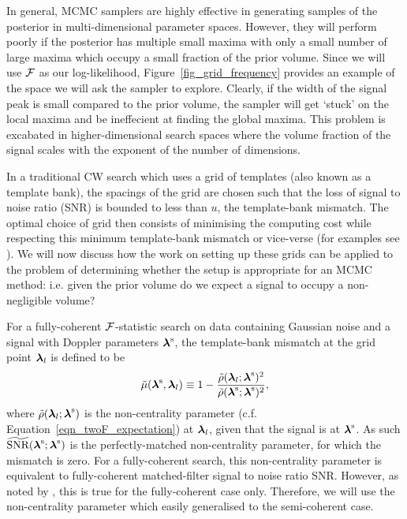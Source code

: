 \documentclass[aps, prd, twocolumn, superscriptaddress, floatfix, showpacs, nofootinbib, longbibliography]{revtex4-1}
\begin{document}
In general, MCMC samplers are highly effective in generating samples of the
posterior in multi-dimensional parameter spaces. However, they will perform
poorly if the posterior has multiple small maxima with only a small number of
large maxima which occupy a small fraction of the prior volume. Since we will
use ${\mathcal{F}}$ as our log-likelihood, Figure~\ref{fig_grid_frequency} provides an
example of the space we will ask the sampler to explore. Clearly, if the width
of the signal peak is small compared to the prior volume, the sampler will get
`stuck' on the local maxima and be ineffecient at finding the global maxima.
This problem is excabated in higher-dimensional search spaces where the volume
fraction of the signal scales with the exponent of the number of dimensions.

In a traditional CW search which uses a grid of templates (also known as a
template bank), the spacings of the grid are chosen such that the loss of
signal to noise ratio (SNR) is bounded to less than $u$, the template-bank
mismatch. The optimal choice of grid then consists of minimising the computing
cost while respecting this minimum template-bank mismatch or vice-verse (for
examples see \citet{pletsch2010, prix2012, wette2013, wette2015}). We will now
discuss how the work on setting up these grids can be applied to the problem of
determining whether the setup is appropriate for an MCMC method: i.e. given the
prior volume do we expect a signal to occupy a non-negligible volume?

For a fully-coherent ${\mathcal{F}}$-statistic search on data containing Gaussian noise
and a signal with Doppler parameters $\boldsymbol{\mathbf{\lambda}}^{\rm s}$, the template-bank
mismatch at the grid point $\boldsymbol{\mathbf{\lambda}}_{l}$ is defined to be
\begin{align}
\tilde{\mu}(\boldsymbol{\mathbf{\lambda}}^{\rm s}, \boldsymbol{\mathbf{\lambda}}_{l}) \equiv 1 - 
\frac{\tilde{\rho}(\boldsymbol{\mathbf{\lambda}}_l;\boldsymbol{\mathbf{\lambda}}^{\rm s})^{2}}
{\tilde{\rho}(\boldsymbol{\mathbf{\lambda}}^{\rm s}; \boldsymbol{\mathbf{\lambda}}^{\rm s})^{2}},
\end{align}
where $\tilde{\rho}(\boldsymbol{\mathbf{\lambda}}_l; \boldsymbol{\mathbf{\lambda}}^{\rm s})$ is the non-centrality
parameter (c.f. Equation~\ref{eqn_twoF_expectation}) at $\boldsymbol{\mathbf{\lambda}}_l$, given
that the signal is at $\boldsymbol{\mathbf{\lambda}}^{\rm s}$. As such
$\widetilde{\textrm{SNR}}(\boldsymbol{\mathbf{\lambda}}^{\rm s}; \boldsymbol{\mathbf{\lambda}}^{\rm s})$ is the
perfectly-matched non-centrality parameter, for which the mismatch is zero.
For a fully-coherent search, this non-centrality parameter is equivalent to
fully-coherent matched-filter signal to noise ratio SNR. However,
as noted by \citet{leaci2015}, this is true for the fully-coherent case only.
Therefore, we will use the non-centrality parameter which easily generalised to
the semi-coherent case.
\end{document}
